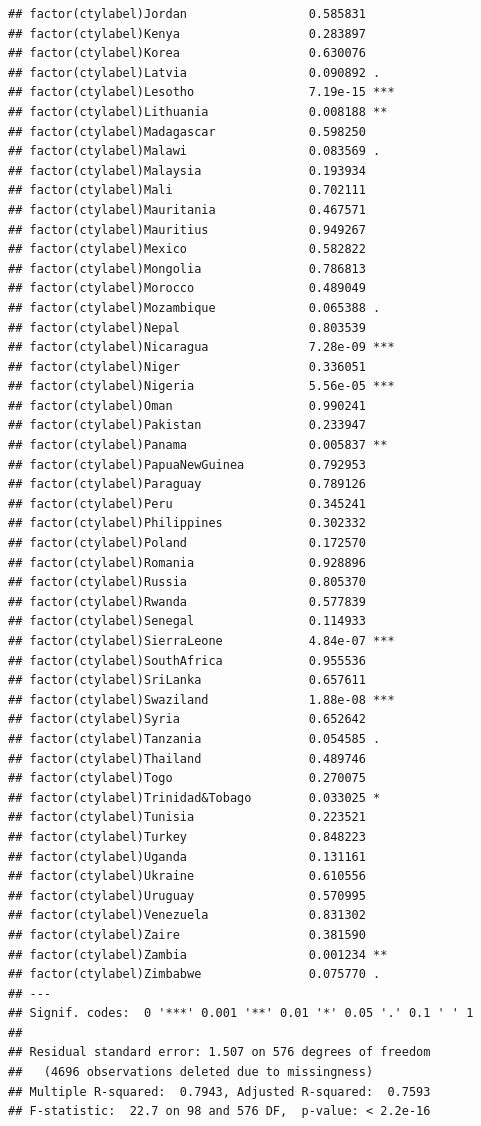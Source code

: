 \documentclass[12pt]{article}\usepackage[]{graphicx}\usepackage[]{color}
\makeatletter
\newenvironment{kframe}{%
 \def\at@end@of@kframe{}%
 \ifinner\ifhmode%
  \def\at@end@of@kframe{\end{minipage}}%
  \begin{minipage}{\columnwidth}%
 \fi\fi%
 \def\FrameCommand##1{\hskip\@totalleftmargin \hskip-\fboxsep
 \colorbox{shadecolor}{##1}\hskip-\fboxsep
     \hskip-\linewidth \hskip-\@totalleftmargin \hskip\columnwidth}%
 \MakeFramed {\advance\hsize-\width
   \@totalleftmargin\z@ \linewidth\hsize
   \@setminipage}}%
 {\par\unskip\endMakeFramed%
 \at@end@of@kframe}
\newenvironment{knitrout}{}{} %
\makeatother
\begin{document}
\begin{knitrout}
\begin{kframe}
\begin{verbatim}
## factor(ctylabel)Jordan                 0.585831    
## factor(ctylabel)Kenya                  0.283897    
## factor(ctylabel)Korea                  0.630076    
## factor(ctylabel)Latvia                 0.090892 .  
## factor(ctylabel)Lesotho                7.19e-15 ***
## factor(ctylabel)Lithuania              0.008188 ** 
## factor(ctylabel)Madagascar             0.598250    
## factor(ctylabel)Malawi                 0.083569 .  
## factor(ctylabel)Malaysia               0.193934    
## factor(ctylabel)Mali                   0.702111    
## factor(ctylabel)Mauritania             0.467571    
## factor(ctylabel)Mauritius              0.949267    
## factor(ctylabel)Mexico                 0.582822    
## factor(ctylabel)Mongolia               0.786813    
## factor(ctylabel)Morocco                0.489049    
## factor(ctylabel)Mozambique             0.065388 .  
## factor(ctylabel)Nepal                  0.803539    
## factor(ctylabel)Nicaragua              7.28e-09 ***
## factor(ctylabel)Niger                  0.336051    
## factor(ctylabel)Nigeria                5.56e-05 ***
## factor(ctylabel)Oman                   0.990241    
## factor(ctylabel)Pakistan               0.233947    
## factor(ctylabel)Panama                 0.005837 ** 
## factor(ctylabel)PapuaNewGuinea         0.792953    
## factor(ctylabel)Paraguay               0.789126    
## factor(ctylabel)Peru                   0.345241    
## factor(ctylabel)Philippines            0.302332    
## factor(ctylabel)Poland                 0.172570    
## factor(ctylabel)Romania                0.928896    
## factor(ctylabel)Russia                 0.805370    
## factor(ctylabel)Rwanda                 0.577839    
## factor(ctylabel)Senegal                0.114933    
## factor(ctylabel)SierraLeone            4.84e-07 ***
## factor(ctylabel)SouthAfrica            0.955536    
## factor(ctylabel)SriLanka               0.657611    
## factor(ctylabel)Swaziland              1.88e-08 ***
## factor(ctylabel)Syria                  0.652642    
## factor(ctylabel)Tanzania               0.054585 .  
## factor(ctylabel)Thailand               0.489746    
## factor(ctylabel)Togo                   0.270075    
## factor(ctylabel)Trinidad&Tobago        0.033025 *  
## factor(ctylabel)Tunisia                0.223521    
## factor(ctylabel)Turkey                 0.848223    
## factor(ctylabel)Uganda                 0.131161    
## factor(ctylabel)Ukraine                0.610556    
## factor(ctylabel)Uruguay                0.570995    
## factor(ctylabel)Venezuela              0.831302    
## factor(ctylabel)Zaire                  0.381590    
## factor(ctylabel)Zambia                 0.001234 ** 
## factor(ctylabel)Zimbabwe               0.075770 .  
## ---
## Signif. codes:  0 '***' 0.001 '**' 0.01 '*' 0.05 '.' 0.1 ' ' 1
## 
## Residual standard error: 1.507 on 576 degrees of freedom
##   (4696 observations deleted due to missingness)
## Multiple R-squared:  0.7943,	Adjusted R-squared:  0.7593 
## F-statistic:  22.7 on 98 and 576 DF,  p-value: < 2.2e-16
\end{verbatim}
\end{kframe}
\end{knitrout}
\end{document}
